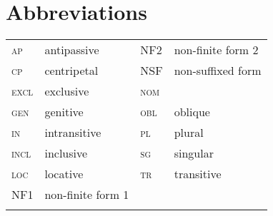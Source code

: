 \documentclass[output=paper,newtxmath,modfonts,nonflat,draftmode]{langsci/langscibook}
\begin{document}
\section*{Abbreviations}
\begin{tabularx}{.55\textwidth}{llll}
	\textsc{ap} & antipassive & NF2 & non-finite form 2\\
	\textsc{cp} & centripetal & NSF & non-suffixed form\\
	\textsc{excl} & exclusive & \textsc{nom} & \isi{nominative}\\
	\textsc{gen} & genitive & \textsc{obl} & oblique\\
	\textsc{in} & intransitive & \textsc{pl} & plural\\
	\textsc{incl} & inclusive & \textsc{sg} & singular\\
	\textsc{loc} & locative & \textsc{tr} & transitive\\
	\textsc{NF1} & non-finite form 1 & & \\
	\\
\end{tabularx}
\sloppy
\printbibliography[heading=subbibliography,notkeyword=this]
\end{document}
